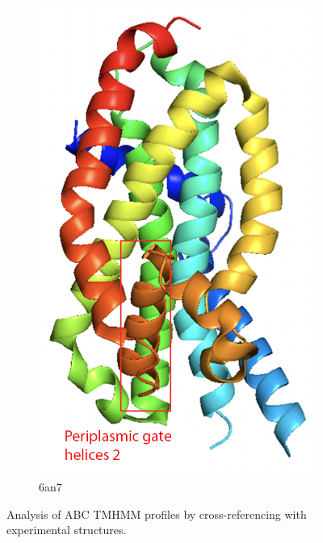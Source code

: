 \begin{figure}[htb]
\begin{subfigure}{0.25\textwidth}
  \includegraphics[width=\linewidth]{introduction/6an7.png}
  \caption{6an7}
  \label{fig:6an7}
\end{subfigure}\hfil %
\caption{Analysis of ABC TMHMM profiles by cross-referencing with experimental structures.}
\small
\label{fig:abc_tmhmm}
\end{figure}


